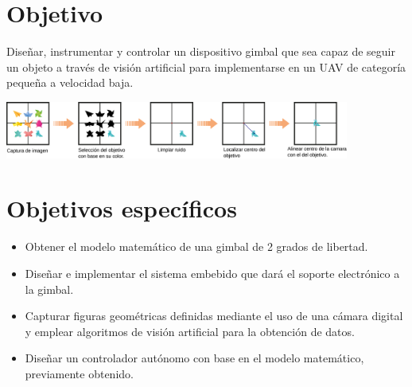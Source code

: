 \section{Objetivo}
Diseñar, instrumentar y controlar un dispositivo gimbal que sea capaz de seguir un objeto a través de visión artificial para implementarse en un UAV de categoría pequeña a velocidad baja.
\begin{center}
    \includegraphics[width=0.85\textwidth]{Capitulo1/Fig0.eps}       
    \label{Fig1}
\end{center}

\section{Objetivos específicos}
\begin{itemize}
    \item Obtener el modelo matemático de una gimbal de 2 grados de libertad.
    \item Diseñar e implementar el sistema embebido que dará el soporte electrónico a la gimbal.
    \item Capturar figuras geométricas definidas  mediante el uso de una cámara digital y emplear algoritmos de visión artificial para la obtención de datos. 
    \item Diseñar un controlador autónomo con base en el modelo matemático, previamente obtenido.
    \end{itemize}

